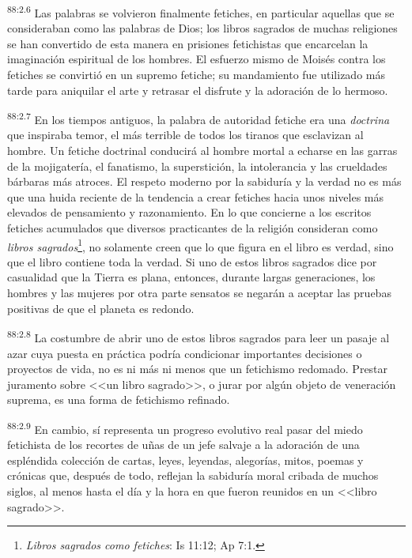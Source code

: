 \documentclass[twoside, 11pt]{book}
\begin{document}
\par
\textsuperscript{88:2.6} Las palabras se volvieron finalmente fetiches, en particular aquellas que se consideraban como las palabras de Dios; los libros sagrados de muchas religiones se han convertido de esta manera en prisiones fetichistas que encarcelan la imaginación espiritual de los hombres. El esfuerzo mismo de Moisés contra los fetiches se convirtió en un supremo fetiche; su mandamiento fue utilizado más tarde para aniquilar el arte y retrasar el disfrute y la adoración de lo hermoso.

\par
\textsuperscript{88:2.7} En los tiempos antiguos, la palabra de autoridad fetiche era una \textit{doctrina} que inspiraba temor, el más terrible de todos los tiranos que esclavizan al hombre. Un fetiche doctrinal conducirá al hombre mortal a echarse en las garras de la mojigatería, el fanatismo, la superstición, la intolerancia y las crueldades bárbaras más atroces. El respeto moderno por la sabiduría y la verdad no es más que una huida reciente de la tendencia a crear fetiches hacia unos niveles más elevados de pensamiento y razonamiento. En lo que concierne a los escritos fetiches acumulados que diversos practicantes de la religión consideran como \textit{libros sagrados}\footnote{\textit{Libros sagrados como fetiches}: Is 11:12; Ap 7:1.}, no solamente creen que lo que figura en el libro es verdad, sino que el libro contiene toda la verdad. Si uno de estos libros sagrados dice por casualidad que la Tierra es plana, entonces, durante largas generaciones, los hombres y las mujeres por otra parte sensatos se negarán a aceptar las pruebas positivas de que el planeta es redondo.

\par
\textsuperscript{88:2.8} La costumbre de abrir uno de estos libros sagrados para leer un pasaje al azar cuya puesta en práctica podría condicionar importantes decisiones o proyectos de vida, no es ni más ni menos que un fetichismo redomado. Prestar juramento sobre <<un libro sagrado>>, o jurar por algún objeto de veneración suprema, es una forma de fetichismo refinado.

\par
\textsuperscript{88:2.9} En cambio, sí representa un progreso evolutivo real pasar del miedo fetichista de los recortes de uñas de un jefe salvaje a la adoración de una espléndida colección de cartas, leyes, leyendas, alegorías, mitos, poemas y crónicas que, después de todo, reflejan la sabiduría moral cribada de muchos siglos, al menos hasta el día y la hora en que fueron reunidos en un <<libro sagrado>>.
\end{document}

